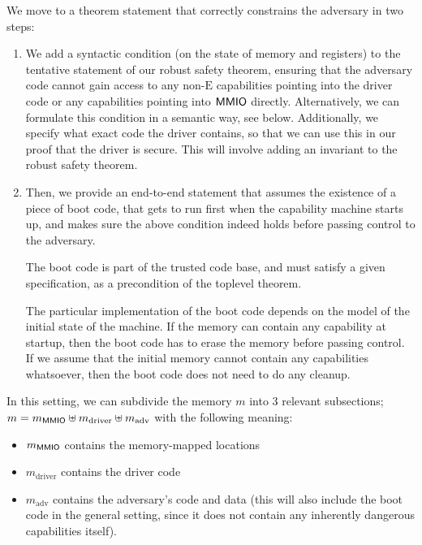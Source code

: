 \documentclass{article}
\newcommand{\X}[1]{\ensuremath{\mathrm{#1}}}
\newcommand{\MMIO}{\textlog{MMIO}\xspace}
\begin{document}
We move to a theorem statement that correctly constrains the adversary in two
steps:
%
\begin{enumerate}
  \item We add a syntactic condition (on the state of memory and registers) to
    the tentative statement of our robust safety theorem, ensuring that the
    adversary code cannot gain access to any non-$\X{E}$ capabilities pointing into
    the driver code or any capabilities pointing into $\MMIO$ directly.
    Alternatively, we can formulate this condition in a semantic way, see below.
    Additionally, we specify what exact code the driver contains, so that we can
    use this in our proof that the driver is secure. This will involve adding an
    invariant to the robust safety theorem.
%
  \item Then, we provide an end-to-end statement that assumes the existence of a
    piece of boot code, that gets to run first when the capability machine
    starts up, and makes sure the above condition indeed holds before passing
    control to the adversary.

    The boot code is part of the trusted code base, and must satisfy a given
    specification, as a precondition of the toplevel theorem.

    The particular implementation of the boot code depends on the model of the
    initial state of the machine. If the memory can contain any capability at
    startup, then the boot code has to erase the memory before passing control.
    If we assume that the initial memory cannot contain any capabilities
    whatsoever, then the boot code does not need to do any cleanup.
\end{enumerate}

In this setting, we can subdivide the memory $m$ into 3 relevant subsections;
$m = m_{\MMIO} \uplus m_{\X{driver}} \uplus m_{\X{adv}}$ %
with the following meaning:
\begin{itemize}
\item $m_{\MMIO}$ contains the memory-mapped locations
\item $m_{\X{driver}}$ contains the driver code
\item  $m_{\X{adv}}$ contains the adversary's code and data (this will also
  include the boot code in the general setting, since it does not contain any
  inherently dangerous capabilities itself).
\end{itemize}

\newcommand{\nonCap}[1]{\ensuremath{\mathrm{nonCap}(#1)}}
\end{document}
